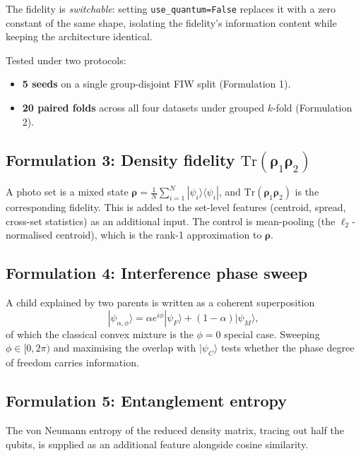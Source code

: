 \documentclass[preprint,12pt]{elsarticle}
\newcommand{\ket}[1]{|#1\rangle}
\newcommand{\bra}[1]{\langle#1|}
\begin{document}
The fidelity is \emph{switchable}: setting \texttt{use\_quantum=False}
replaces it with a zero constant of the same shape, isolating the
fidelity's information content while keeping the architecture identical.

Tested under two protocols:
\begin{itemize}
\item \textbf{5 seeds} on a single group-disjoint FIW split (Formulation 1).
\item \textbf{20 paired folds} across all four datasets under grouped
$k$-fold (Formulation 2).
\end{itemize}

\subsection{Formulation 3: Density fidelity \texorpdfstring{$\mathrm{Tr}(\bm{\rho}_1\bm{\rho}_2)$}{Tr(rho1 rho2)}}

A photo set is a mixed state
$\bm{\rho} = \frac{1}{N}\sum_{i=1}^{N}
\ket{\psi_i}\bra{\psi_i}$,
and $\mathrm{Tr}(\bm{\rho}_1 \bm{\rho}_2)$ is the corresponding fidelity.
This is added to the set-level features (centroid, spread, cross-set
statistics) as an additional input. The control is mean-pooling (the
$\ell_2$-normalised centroid), which is the rank-1 approximation to
$\bm{\rho}$.

\subsection{Formulation 4: Interference phase sweep}

A child explained by two parents is written as a coherent superposition
\begin{equation}
\ket{\psi_{\alpha,\phi}} = \alpha e^{i\phi}\ket{\psi_F}
+ (1-\alpha)\ket{\psi_M},
\end{equation}
of which the classical convex mixture is the $\phi=0$ special case. Sweeping
$\phi \in [0, 2\pi)$ and maximising the overlap with $\ket{\psi_C}$ tests
whether the phase degree of freedom carries information.

\subsection{Formulation 5: Entanglement entropy}

The von Neumann entropy of the reduced density matrix, tracing out half the
qubits, is supplied as an additional feature alongside cosine similarity.
\end{document}
